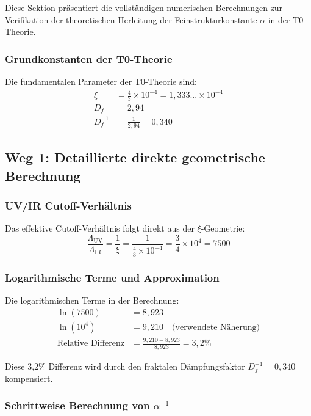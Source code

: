 \documentclass[12pt,a4paper]{article}
\theoremstyle{definition}
\begin{document}
	Diese Sektion präsentiert die vollständigen numerischen Berechnungen zur Verifikation der theoretischen Herleitung der Feinstrukturkonstante $\alpha$ in der T0-Theorie.
	
	\subsubsection{Grundkonstanten der T0-Theorie}
	
	Die fundamentalen Parameter der T0-Theorie sind:
	\begin{align}
		\xi &= \frac{4}{3} \times 10^{-4} = 1{,}333... \times 10^{-4} \\
		D_f &= 2{,}94 \\
		D_f^{-1} &= \frac{1}{2{,}94} = 0{,}340
	\end{align}
	
	\subsection{Weg 1: Detaillierte direkte geometrische Berechnung}
	
	\subsubsection{UV/IR Cutoff-Verhältnis}
	
	Das effektive Cutoff-Verhältnis folgt direkt aus der $\xi$-Geometrie:
	\begin{equation}
		\frac{\Lambda_{\text{UV}}}{\Lambda_{\text{IR}}} = \frac{1}{\xi} = \frac{1}{\frac{4}{3} \times 10^{-4}} = \frac{3}{4} \times 10^4 = 7500
	\end{equation}
	
	\subsubsection{Logarithmische Terme und Approximation}
	
	Die logarithmischen Terme in der Berechnung:
	\begin{align}
		\ln(7500) &= 8{,}923 \\
		\ln(10^4) &= 9{,}210 \quad \text{(verwendete Näherung)} \\
		\text{Relative Differenz} &= \frac{9{,}210 - 8{,}923}{8{,}923} = 3{,}2\%
	\end{align}
	
	Diese 3{,}2\% Differenz wird durch den fraktalen Dämpfungsfaktor $D_f^{-1} = 0{,}340$ kompensiert.
	
	\subsubsection{Schrittweise Berechnung von $\alpha^{-1}$}
	
\end{document}
